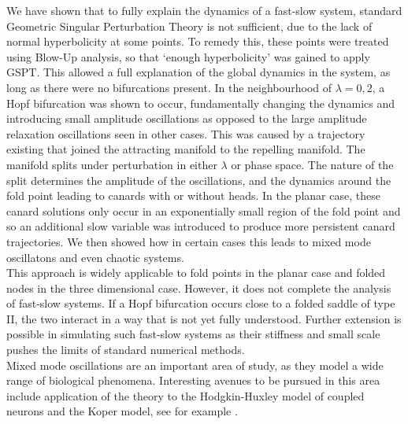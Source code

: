 We have shown that to fully explain the dynamics of a fast-slow system, standard
Geometric Singular Perturbation Theory is not sufficient, due to the lack of
normal hyperbolicity at some points. To remedy this, these points were treated using Blow-Up analysis,
so that `enough hyperbolicity' was gained to apply GSPT. This allowed a full
explanation of the global dynamics in the system, as long as there were no
bifurcations present. In the neighbourhood of $\lambda=0,2$, a Hopf bifurcation
was shown to occur, fundamentally changing the dynamics and introducing small
amplitude oscillations as opposed to the large amplitude relaxation oscillations
seen in other cases. This was caused by a trajectory existing that joined the
attracting manifold to the repelling manifold. The manifold splits under perturbation in either $\lambda$ or phase space. The nature of the split determines the amplitude of the oscillations, and the dynamics around the fold point leading to canards with or without heads. In the planar case, these canard solutions only occur in an
exponentially small region of the fold point and so an additional slow variable was
introduced to produce more persistent canard trajectories. We then showed how in
certain cases this leads to mixed mode oscillatons and even chaotic systems. \\

This approach is widely applicable to fold points in the planar case and folded
nodes in the three dimensional case. However, it does not complete the analysis
of fast-slow systems. If a Hopf bifurcation occurs close to a folded saddle of type II,
the two interact in a way that is not yet fully understood. Further extension is
possible in simulating such fast-slow systems as their stiffness and small scale
pushes the limits of standard numerical methods. \\  

Mixed mode oscillations are an important area of study, as they model a wide range
of biological phenomena. Interesting avenues to be pursued in this area include application of the theory to
the Hodgkin-Huxley model of coupled neurons and the Koper model, see for example \cite{MMO}.
